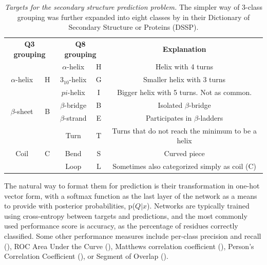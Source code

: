 
\begin{table}[h]
	\begin{tabular}{cc|cc|c}
		\multicolumn{2}{c}{\textbf{Q3 grouping}} & \multicolumn{2}{c}{\textbf{Q8 grouping}} &  \textbf{Explanation} \\ 
		&   & $\alpha$-helix & H & Helix with 4 turns \\ 
		$\alpha$-helix    & H & $3_{10}$-helix & G & Smaller helix with 3 turns \\ 
		&   & $pi$-helix      & I & Bigger helix with 5 turns. Not as common.\\ \hline
		\multirow{2}{*}{$\beta$-sheet}    & \multirow{2}{*}{B} & $\beta$-bridge & B & Isolated $\beta$-bridge \\ 
		&                       & $\beta$-strand & E & Participates in $\beta$-ladders \\ \hline
		&   & Turn & T & Turns that do not reach the minimum to be a helix \\ 
		Coil    & C & Bend & S & Curved piece \\ 
		&   & Loop & L & Sometimes also categorized simply as coil (C)
	\end{tabular}
	\label{tab:q8}
	\caption{\textit{Targets for the secondary structure prediction problem.} The simpler way of 3-class grouping was further expanded into eight classes by \cite{Kabsch1983} in their Dictionary of Secondary Structure or Proteins (DSSP).}
\end{table}

The natural way to format them for prediction is their transformation in one-hot vector form, with a softmax function as the last layer of the network as a means to provide with posterior probabilities, p($Q|x$). Networks are typically trained using cross-entropy between targets and predictions, and the most commonly used performance score is accuracy, as the percentage of residues correctly classified. Some other performance measures include per-class precision and recall (\cite{Wang2016}), ROC Area Under the Curve (\cite{Hattori2017}), Matthews correlation coefficient (\cite{Fang2017}), Person's Correlation Coefficient (\cite{Jurtz2017}), or Segment of Overlap (\cite{Wang2016}).

